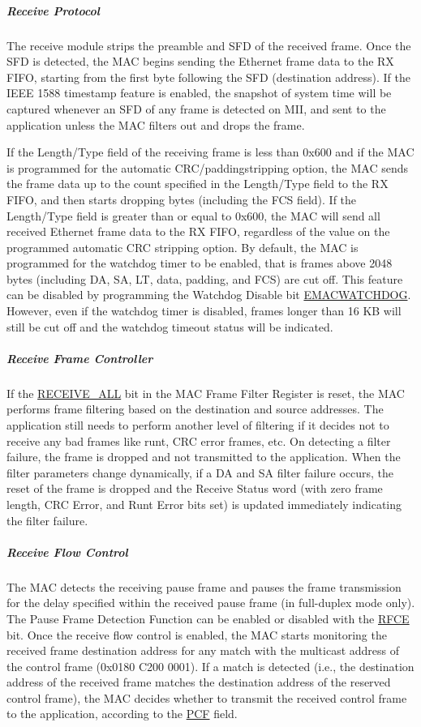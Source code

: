 \documentclass[main\_\_EN.tex]{subfiles}
\begin{document}
\subparagraph{Receive Protocol}
The receive module strips the preamble and SFD of the received frame. Once the SFD is detected, the MAC begins sending the Ethernet frame data to the RX FIFO, starting from the first byte following the SFD (destination address). If the IEEE 1588 timestamp feature is enabled, the snapshot of system time will be captured whenever an SFD of any frame is detected on MII, and sent to the application unless the MAC filters out and drops the frame.

If the Length/Type field of the receiving frame is less than 0x600 and if the MAC is programmed for the automatic CRC/paddingstripping option, the MAC  sends the frame data up to the count specified in the Length/Type field to the RX FIFO, and then starts dropping bytes (including the FCS field). If the Length/Type field is greater than or equal to 0x600, the MAC will send all received Ethernet frame data to the RX FIFO, regardless of the value on the programmed automatic CRC stripping option. By default, the MAC is programmed for the watchdog timer to be enabled, that is frames above 2048 bytes (including DA, SA, LT, data, padding, and FCS) are cut off. This feature can be disabled by programming the Watchdog Disable bit \hyperref[regdesc:EMACCONFIGREG]{EMACWATCHDOG}. However, even if the watchdog timer is disabled, frames longer than 16 KB will still be cut off and the watchdog timeout status will be indicated.

\subparagraph{Receive Frame Controller}
If the \hyperref[regdesc:EMACFFREG]{RECEIVE\_ALL} bit in the MAC Frame Filter Register is reset, the MAC performs frame filtering based on the destination and source addresses. The application still needs to perform another level of filtering if it decides not to receive any bad frames like runt, CRC error frames, etc. On detecting a filter failure, the frame is dropped and not transmitted to the application. When the filter parameters change dynamically, if a DA and SA filter failure occurs, the reset of the frame is dropped and the Receive Status word (with zero frame length, CRC Error, and Runt Error bits set) is updated immediately indicating the filter failure.

\subparagraph{Receive Flow Control}
The MAC detects the receiving pause frame and pauses the frame transmission for the delay specified within the received pause frame (in full-duplex mode only). The Pause Frame Detection Function can be enabled or disabled with the \hyperref[regdesc:EMACFLOWCONTROLREG]{RFCE} bit. Once the receive flow control is enabled, the MAC starts monitoring the received frame destination address for any match with the multicast address of the control frame (0x0180 C200 0001). If a match is detected (i.e., the destination address of the received frame matches the destination address of the reserved control frame), the MAC decides whether to transmit the received control frame to the application, according to the \hyperref[regdesc:EMACFFREG]{PCF} field.
\end{document}
